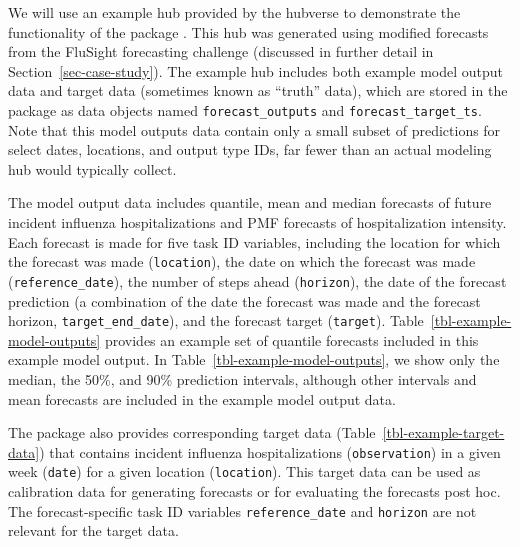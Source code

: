 \documentclass[
  article,
  shortnames,
  notitle]{jss}
\begin{document}
\begin{longtable}[]
\caption{\label{tbl-example-model-outputs}Example model output for
forecasts of incident influenza hospitalizations. A subset of example
model output is shown: 1-week ahead quantile forecasts made on
2022-12-17 for Massachusetts from three distinct models; only the median
and 5th, 25th, 75th and 95th quantiles are displayed. The
\texttt{location}, \texttt{reference\_date} and
\texttt{target\_end\_date} columns have been omitted for brevity. This
example data is provided in the  package.}

\tabularnewline
\end{longtable}

We will use an example hub provided by the hubverse to demonstrate the
functionality of the  package \citep{hubverse_docs}.
This hub was generated using modified forecasts from the FluSight
forecasting challenge (discussed in further detail in
Section~\ref{sec-case-study}). The example hub includes both example
model output data and target data (sometimes known as ``truth'' data),
which are stored in the  package as data objects named
\texttt{forecast\_outputs} and \texttt{forecast\_target\_ts}. Note that
this model outputs data contain only a small subset of predictions for
select dates, locations, and output type IDs, far fewer than an actual
modeling hub would typically collect.

The model output data includes quantile, mean and median forecasts of
future incident influenza hospitalizations and PMF forecasts of
hospitalization intensity. Each forecast is made for five task ID
variables, including the location for which the forecast was made
(\texttt{location}), the date on which the forecast was made
(\texttt{reference\_date}), the number of steps ahead
(\texttt{horizon}), the date of the forecast prediction (a combination
of the date the forecast was made and the forecast horizon,
\texttt{target\_end\_date}), and the forecast target (\texttt{target}).
Table~\ref{tbl-example-model-outputs} provides an example set of
quantile forecasts included in this example model output. In
Table~\ref{tbl-example-model-outputs}, we show only the median, the
50\%, and 90\% prediction intervals, although other intervals and mean
forecasts are included in the example model output data.

The  package also provides corresponding target data
(Table~\ref{tbl-example-target-data}) that contains incident influenza
hospitalizations (\texttt{observation}) in a given week (\texttt{date})
for a given location (\texttt{location}). This target data can be used
as calibration data for generating forecasts or for evaluating the
forecasts post hoc. The forecast-specific task ID variables
\texttt{reference\_date} and \texttt{horizon} are not relevant for the
target data.
\end{document}
